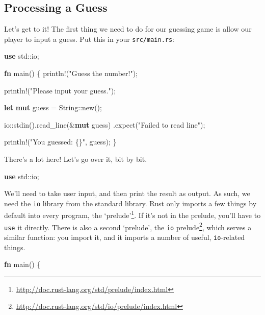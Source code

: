 \documentclass[a4paper,]{book}
\newenvironment{Shaded}{\begin{snugshade}}{\end{snugshade}}
\newcommand{\KeywordTok}[1]{\textcolor[rgb]{0.13,0.29,0.53}{\textbf{{#1}}}}
\newcommand{\StringTok}[1]{\textcolor[rgb]{0.31,0.60,0.02}{{#1}}}
\newcommand{\OtherTok}[1]{\textcolor[rgb]{0.56,0.35,0.01}{{#1}}}
\newcommand{\NormalTok}[1]{{#1}}
\renewcommand{\href}[2]{#2\footnote{\url{#1}}}
\begin{document}
\subsection{Processing a Guess}\label{processing-a-guess}

Let's get to it! The first thing we need to do for our guessing game is
allow our player to input a guess. Put this in your
\texttt{src/main.rs}:

\begin{Shaded}
\begin{Highlighting}[]
\KeywordTok{use} \NormalTok{std::io;}

\KeywordTok{fn} \NormalTok{main() \{}
    \OtherTok{println!}\NormalTok{(}\StringTok{"Guess the number!"}\NormalTok{);}

    \OtherTok{println!}\NormalTok{(}\StringTok{"Please input your guess."}\NormalTok{);}

    \KeywordTok{let} \KeywordTok{mut} \NormalTok{guess = String::new();}

    \NormalTok{io::stdin().read_line(&}\KeywordTok{mut} \NormalTok{guess)}
        \NormalTok{.expect(}\StringTok{"Failed to read line"}\NormalTok{);}

    \OtherTok{println!}\NormalTok{(}\StringTok{"You guessed: \{\}"}\NormalTok{, guess);}
\NormalTok{\}}
\end{Highlighting}
\end{Shaded}

There's a lot here! Let's go over it, bit by bit.

\begin{Shaded}
\begin{Highlighting}[]
\KeywordTok{use} \NormalTok{std::io;}
\end{Highlighting}
\end{Shaded}

We'll need to take user input, and then print the result as output. As
such, we need the \texttt{io} library from the standard library. Rust
only imports a few things by default into every program,
\href{http://doc.rust-lang.org/std/prelude/index.html}{the `prelude'}.
If it's not in the prelude, you'll have to \texttt{use} it directly.
There is also a second `prelude', the
\href{http://doc.rust-lang.org/std/io/prelude/index.html}{\texttt{io}
prelude}, which serves a similar function: you import it, and it imports
a number of useful, \texttt{io}-related things.

\begin{Shaded}
\begin{Highlighting}[]
\KeywordTok{fn} \NormalTok{main() \{}
\end{Highlighting}
\end{Shaded}
\end{document}
